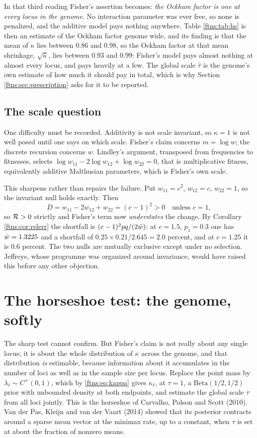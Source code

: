 In that third reading Fisher's assertion becomes: \emph{the Ockham factor is one at every locus in
the genome}. No interaction parameter was ever free, so none is penalized, and the additive model
pays nothing anywhere. Table \ref{ftns:tab:hs} is then an estimate of the Ockham factor genome wide, and
its finding is that the mean of $\kappa$ lies between $0.86$ and $0.98$, so the Ockham factor at
that mean shrinkage, $\sqrt{\bar\kappa}$, lies between $0.93$ and $0.99$: Fisher's model pays almost nothing at almost every locus, and pays
heavily at a few. The global scale $\hat\tau$ is the genome's own estimate of how much it should
pay in total, which is why Section \ref{ftns:sec:prescription} asks for it to be reported.

\subsection{The scale question}
\label{ftns:sec:scale}

One difficulty must be recorded. Additivity is not scale invariant, so $\kappa=1$ is not well posed
until one says on which scale. Fisher's claim concerns $m=\log w$; the discrete recursion concerns
$w$. Lindley's argument, transposed from frequencies to fitnesses, selects
$\log w_{11}-2\log w_{12}+\log w_{22}=0$, that is multiplicative fitness, equivalently additive
Malthusian parameters, which is Fisher's own scale.

This sharpens rather than repairs the failure. Put $w_{11}=c^2$, $w_{12}=c$, $w_{22}=1$, so the
invariant null holds exactly. Then
\[
D=w_{11}-2w_{12}+w_{22}=(c-1)^2>0 \quad\text{unless } c=1 ,
\]
so $\mathcal{R}>0$ strictly and Fisher's term now \emph{understates} the change. By
Corollary \ref{ftns:cor:relerr} the shortfall is $(c-1)^2pq/(2\bar{w})$: at $c=1.5$, $p_1=0.3$ one has
$\bar{w}=1.3225$ and a shortfall of $0.25\times0.21/2.645=2.0$ percent, and at $c=1.25$ it is
$0.6$ percent. The two nulls are mutually exclusive except under
no selection. Jeffreys, whose programme was organized around invariance, would have raised this
before any other objection.

\section{The horseshoe test: the genome, softly}
\label{ftns:sec:horseshoe}

The sharp test cannot confirm. But Fisher's claim is not really about any single locus; it is about
the whole distribution of $\kappa$ across the genome, and that distribution \emph{is} estimable,
because information about it accumulates in the number of loci as well as in the sample size per
locus. Replace the point mass by $\lambda_\ell\sim C^+(0,1)$, which by \eqref{ftns:eq:kappa} gives
$\kappa_\ell$, at $\tau=1$, a $\text{Beta}(1/2,1/2)$ prior with unbounded density at both endpoints, and estimate
the global scale $\tau$ from all loci jointly. This is the horseshoe of Carvalho, Polson and Scott
(2010). Van der Pas, Kleijn and van der Vaart (2014) showed that its posterior contracts around a sparse mean vector at the minimax rate, up to a constant, when $\tau$ is set at about the fraction of nonzero means.

